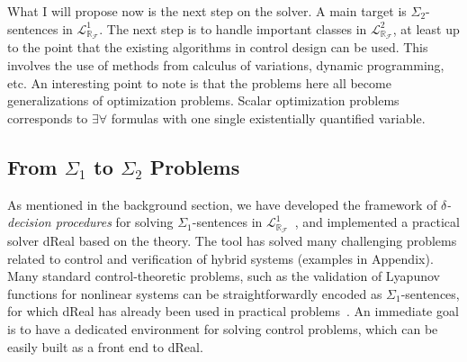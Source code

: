 \documentclass[10pt]{article}
\newcommand{\lrf}{\mathcal{L}_{\mathbb{R}_{\mathcal{F}}}}
\theoremstyle{definition}
\begin{document}
What I will propose now is the next step on the solver. A main target is $\Sigma_2$-sentences in $\lrf^1$. The next step is to handle important classes in $\lrf^2$, at least up to the point that the existing algorithms in control design can be used. This involves the use of methods from calculus of variations, dynamic programming, etc. An interesting point to note is that the problems here all become generalizations of optimization problems. Scalar optimization problems corresponds to $\exists\forall$ formulas with one single existentially quantified variable. 

\subsection{From $\Sigma_1$ to $\Sigma_2$ Problems} 

As mentioned in the background section, we have developed the framework of {\em $\delta$-decision procedures} for solving $\Sigma_1$-sentences in $\lrf^1$~\cite{DBLP:conf/cade/GaoAC12}, and implemented a practical solver dReal based on the theory. The tool has solved many challenging problems related to control and verification of hybrid systems (examples in Appendix). Many standard control-theoretic problems, such as the validation of Lyapunov functions for nonlinear systems can be straightforwardly encoded as $\Sigma_1$-sentences, for which dReal has already been used in practical problems~\cite{DBLP:conf/hybrid/KapinskiDSA14}. An immediate goal is to have a dedicated environment for solving control problems, which can be easily built as a front end to dReal. 
\end{document}
